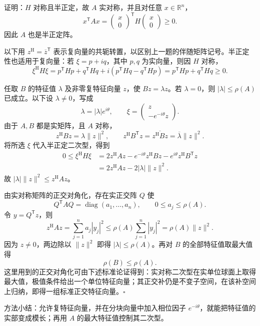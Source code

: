 \documentclass[11pt,a4paper]{article}
\newcommand{\proofend}{\hfill$\square$\par}
\begin{document}
\noindent 证明：$H$ 对称且半正定，故 $A$ 实对称，并且对任意 $x\in\mathbb R^n$，
\[
x^{\mathsf T}Ax=
\begin{pmatrix}x\\0\end{pmatrix}^{\mathsf T}
H\begin{pmatrix}x\\0\end{pmatrix}\ge0.
\]
因此 $A$ 也是半正定阵。

以下用 $z^{\mathrm H}=\overline z^{\mathsf T}$ 表示复向量的共轭转置，以区别上一题的伴随矩阵记号。半正定性也适用于复向量：若 $\xi=p+iq$，其中 $p,q$ 为实向量，则因 $H$ 对称，
\[
\xi^{\mathrm H}H\xi
=p^{\mathsf T}Hp+q^{\mathsf T}Hq
+i(p^{\mathsf T}Hq-q^{\mathsf T}Hp)
=p^{\mathsf T}Hp+q^{\mathsf T}Hq\ge0.
\]

任取 $B$ 的特征值 $\lambda$ 及非零复特征向量 $z$，使 $Bz=\lambda z$。若 $\lambda=0$，则 $|\lambda|\le\rho(A)$ 已成立。以下设 $\lambda\ne0$，写成
\[
\lambda=|\lambda|e^{i\theta},\qquad
\xi=\begin{pmatrix}z\\-e^{-i\theta}z\end{pmatrix}.
\]
由于 $A,B$ 都是实矩阵，且 $A$ 对称，
\[
z^{\mathrm H}Bz=\lambda\|z\|^2,\qquad
z^{\mathrm H}B^{\mathsf T}z
=\overline{z^{\mathrm H}Bz}=\overline\lambda\|z\|^2.
\]
将所选 $\xi$ 代入半正定二次型，得到
\begin{align*}
0\le\xi^{\mathrm H}H\xi
&=2z^{\mathrm H}Az
-e^{-i\theta}z^{\mathrm H}Bz
-e^{i\theta}z^{\mathrm H}B^{\mathsf T}z\\
&=2z^{\mathrm H}Az-2|\lambda|\|z\|^2.
\end{align*}
故 $|\lambda|\|z\|^2\le z^{\mathrm H}Az$。

由实对称矩阵的正交对角化，存在实正交阵 $Q$ 使
\[
Q^{\mathsf T}AQ=\operatorname{diag}(a_1,\ldots,a_n),\qquad
0\le a_j\le\rho(A).
\]
令 $y=Q^{\mathsf T}z$，则
\[
z^{\mathrm H}Az=\sum_{j=1}^{n}a_j|y_j|^2
\le\rho(A)\sum_{j=1}^{n}|y_j|^2
=\rho(A)\|z\|^2.
\]
因为 $z\ne0$，两边除以 $\|z\|^2$ 即得 $|\lambda|\le\rho(A)$。再对 $B$ 的全部特征值取最大值得
\[
\boxed{\rho(B)\le\rho(A)}.
\]
这里用到的正交对角化可由下述标准论证得到：实对称二次型在实单位球面上取得最大值，极值条件给出一个单位特征向量；其正交补仍是不变子空间，在该补空间上归纳，即得一组标准正交特征向量。\proofend

\noindent 方法小结：允许复特征向量，并在分块向量中加入相位因子 $e^{-i\theta}$，就能把特征值的实部变成模长；再用 $A$ 的最大特征值控制其二次型。
\end{document}
